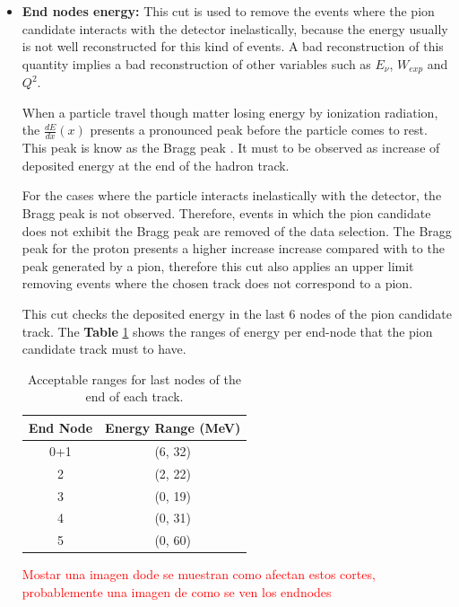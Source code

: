 \begin{itemize}
    
    \item \textbf{End nodes energy:} This cut is used to remove the events where the pion candidate interacts with the detector inelastically, because the energy usually is not well reconstructed for this kind of events. A bad reconstruction of this quantity implies a bad reconstruction of other variables such as $E_\nu$, $W_{exp}$ and $Q^2$. 

    When a particle travel though matter losing energy by ionization radiation, the $\frac{dE}{dx}(x)$ presents a pronounced peak before the particle comes to rest. This peak is know as the Bragg peak \cite{BraggCurves}. It must to be observed as increase of deposited energy at the end of the hadron track. 

    For the cases where the particle interacts inelastically with the detector, the Bragg peak is not observed. Therefore, events in which the pion candidate does not exhibit the Bragg peak are removed of the data selection. The Bragg peak for the proton presents a higher increase increase compared with to the peak generated by a pion, therefore this cut also applies an upper limit removing events where the chosen track does not correspond to a pion. 

    This cut checks the deposited energy in the last 6 nodes of the pion candidate track. The \textbf{Table} \ref{tab:Analysis:Cuts:EndnodeCuts} shows the ranges of energy per end-node that the pion candidate track must to have.  

    \begin{table}[]
        \centering
        \begin{tabular}{c|c}
            End Node & Energy Range (MeV)\\ \hline
            0+1      & (6, 32) \\
            2        & (2, 22) \\
            3        & (0, 19) \\
            4        & (0, 31) \\
            5        & (0, 60) \\
        \end{tabular}
        \caption{Acceptable ranges for last nodes of the end of each track.}
        \label{tab:Analysis:Cuts:EndnodeCuts}
    \end{table}
    
    \textcolor{red}{Mostar una imagen dode se muestran como afectan estos cortes, probablemente una imagen de como se ven los endnodes}


\end{itemize}
